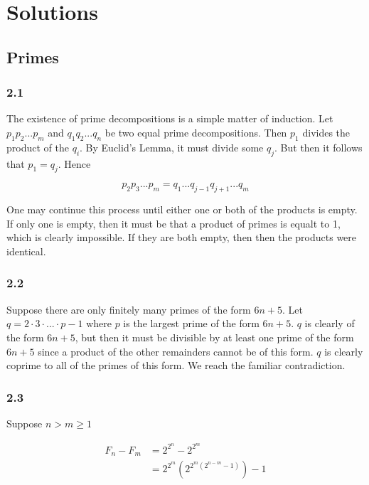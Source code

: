 \section{Solutions}

\subsection{Primes}

\subsubsection{2.1}
The existence of prime decompositions is a simple matter 
of induction. Let $p_1 p_2 ... p_m$ and $q_1q_2...q_n$ be 
two equal prime decompositions. Then $p_1$ divides the 
product of the $q_i$. By Euclid's Lemma, it must divide 
some $q_j$. But then it follows that $p_1 = q_j$. Hence

\begin{equation*}
    p_2 p_3 ... p_m = q_1 ... q_{j-1}q_{j+1} ... q_m
\end{equation*}

One may continue this process until either one or both of 
the products is empty. If only one is empty, then it must 
be that a product of primes is equalt to 1, which is 
clearly impossible. If they are both empty, then then 
the products were identical.

\subsubsection{2.2}

Suppose there are only finitely many primes of the form 
$6n+5$. Let $q = 2 \cdot 3 \cdot ... \cdot p - 1$ where 
$p$ is the largest prime of the form $6n+5$. $q$ is 
clearly of the form $6n+5$, but then it must be divisible 
by at least one prime of the form $6n+5$ since a product 
of the other remainders cannot be of this form. 
$q$ is clearly coprime to all of the primes of this form. 
We reach the familiar contradiction.

\subsubsection{2.3}
Suppose $n>m\geq 1$

\begin{align*}
    F_n - F_m &= 2^{2^n} - 2^{2^m} \\
    &= 2^{2^m}(2^{2^m(2^{n-m} - 1)}) - 1 
\end{align*}

